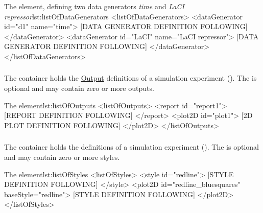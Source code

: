 
\begin{myXmlLst}{The  element, defining two data generators \emph{time} and \emph{LaCI repressor}}{lst:listOfDataGenerators}
<listOfDataGenerators>
	<dataGenerator id="d1" name="time">
		[DATA GENERATOR DEFINITION FOLLOWING]
	</dataGenerator>
	<dataGenerator id="LaCI" name="LaCI repressor">
		[DATA GENERATOR DEFINITION FOLLOWING]
	</dataGenerator>
</listOfDataGenerators>
\end{myXmlLst}


\subsubsection{}
\label{class:listOfOutputs}
The  container holds the \hyperref[class:output]{Output} definitions of a simulation experiment (). The  is optional and may contain zero or more outputs.

\begin{myXmlLst}{The  element}{lst:listOfOutputs}
<listOfOutputs>
	<report id="report1">
		[REPORT DEFINITION FOLLOWING]
	</report>
	<plot2D id="plot1">
		[2D PLOT DEFINITION FOLLOWING] 
	</plot2D>
</listOfOutputs>
\end{myXmlLst}


\begin{blockChanged}
\subsubsection{}
\label{class:listOfStyles}
The  container holds the \Style definitions of a simulation experiment (). The  is optional and may contain zero or more styles.

\begin{myXmlLst}{The  element}{lst:listOfStyles}
<listOfStyles>
	<style id="redline">
		[STYLE DEFINITION FOLLOWING]
	</style>
	<plot2D id="redline_bluesquares" baseStyle="redline">
		[STYLE DEFINITION FOLLOWING] 
	</plot2D>
</listOfStyles>
\end{myXmlLst}
\end{blockChanged}

